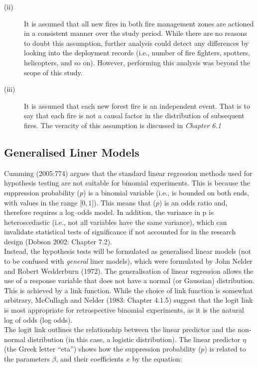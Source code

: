 \begin{spacing}{1.5}
\begin{description}
\item[(ii)]
It is assumed that all new fires in both fire management zones are actioned in a consistent manner over the study period. While there are no reasons to doubt this assumption, further analysis could detect any differences by looking into the deployment records (i.e., number of fire fighters, spotters, helicopters, and so on). However, performing this analysis was beyond the scope of this study. \\

\item[(iii)]
It is assumed that each new forest fire is an independent event. That is to say that each fire is not a causal factor in the distribution of subsequent fires. The veracity of this assumption is discussed in \emph{Chapter 6.1}
\end{description}

\subsection{Generalised Liner Models}

Cumming (2005:774) argues that the standard linear regression methods used for hypothesis testing are not suitable for binomial experiments. This is because the suppression probability ($p$) is a binomial variable (i.e., is bounded on both ends, with values in the range [$0, 1$]). This means that ($p$) is an odds ratio and, therefore requires a log--odds model. In addition, the variance in p is heteroscedastic (i.e., not all variables have the same variance), which can invalidate statistical tests of significance if not accounted for in the research design (Dobson 2002: Chapter 7.2). \\

\noindent Instead, the hypothesis tests will be formulated as generalised linear models (not to be confused with \emph{general} liner models), which were formulated by John Nelder and Robert Wedderburn (1972). The generalisation of linear regression allows the use of a response variable that does not have a normal (or Gaussian) distribution. This is achieved by a link function. While the choice of link function is somewhat arbitrary, McCullagh and Nelder (1983: Chapter 4.1.5) suggest that the logit link is most appropriate for retrospective binomial experiments, as it is the natural log of odds (log odds). \\

\noindent The logit link outlines the relationship between the linear predictor and the non-normal distribution (in this case, a logistic distribution). The linear predictor $\eta$ (the Greek letter ``eta'') shows how the suppression probability ($p$) is related to the parameters $\beta$, and their coefficients $x$ by the equation: \\


\end{spacing}
